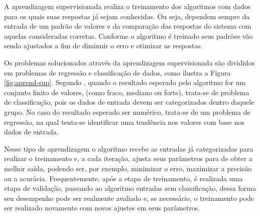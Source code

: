 \documentclass[oneside,openright,12pt]{ufsm_2015} %
\begin{document}
    \par A aprendizagem supervisionada realiza o treinamento dos algoritmos com dados para os quais suas respostas já sejam conhecidas. Ou seja, dependem sempre da entrada de um padrão de valores e da comparação das respostas do sistema com aquelas consideradas corretas. Conforme o algoritmo é treinado seus padrões vão sendo ajustados a fim de diminuir o erro e otimizar as respostas. 

    \par Os problemas solucionados através da aprendizagem supervisionada são divididos em problemas de regressão e classificação de dados, como ilustra a Figura \ref{fig:aprend-sup}. Segundo \cite{book:russell:10}, quando o resultado esperado pelo algoritmo for um conjunto finito de valores, (como fraco, mediano ou forte), trata-se de problema de classificação, pois os dados de entrada devem ser categorizados dentro daquele grupo. No caso do resultado esperado ser numérico, trata-se de um problema de regressão, na qual tenta-se identificar uma tendência nos valores com base nos dados de entrada.

    \par Nesse tipo de aprendizagem o algoritmo recebe as entradas já categorizadas para realizar o treinamento e, a cada iteração, ajusta seus parâmetros para de obter a melhor saída, podendo ser, por exemplo, minimizar o erro, maximizar a precisão ou a acurácia. Frequentemente, após a etapa de treinamento, é realizada uma etapa de validação, passando ao algoritmo entradas sem classificação, dessa forma seu desempenho pode ser realmente avaliado e, se necessário, o treinamento pode ser realizado novamente com novos ajustes em seus parâmetros.
\end{document}
